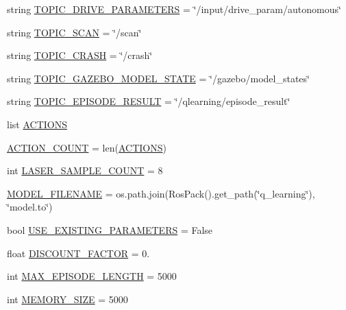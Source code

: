 \begin{DoxyCompactItemize}
\item 
string \hyperlink{namespaceparameters_a855cb11de60782b8e9997af80bdab518}{T\+O\+P\+I\+C\+\_\+\+D\+R\+I\+V\+E\+\_\+\+P\+A\+R\+A\+M\+E\+T\+E\+RS} = \char`\"{}/input/drive\+\_\+param/autonomous\char`\"{}
\item 
string \hyperlink{namespaceparameters_a28de242cdbba10666eb0c95aaef6812b}{T\+O\+P\+I\+C\+\_\+\+S\+C\+AN} = \char`\"{}/scan\char`\"{}
\item 
string \hyperlink{namespaceparameters_a5e392ed4d998f10824bfd96a0eae2988}{T\+O\+P\+I\+C\+\_\+\+C\+R\+A\+SH} = \char`\"{}/crash\char`\"{}
\item 
string \hyperlink{namespaceparameters_a9d4157266ec0afde91ab7d58be4f688d}{T\+O\+P\+I\+C\+\_\+\+G\+A\+Z\+E\+B\+O\+\_\+\+M\+O\+D\+E\+L\+\_\+\+S\+T\+A\+TE} = \char`\"{}/gazebo/model\+\_\+states\char`\"{}
\item 
string \hyperlink{namespaceparameters_aa69db8cd2d598f0d10212ea8df6a2139}{T\+O\+P\+I\+C\+\_\+\+E\+P\+I\+S\+O\+D\+E\+\_\+\+R\+E\+S\+U\+LT} = \char`\"{}/qlearning/episode\+\_\+result\char`\"{}
\item 
list \hyperlink{namespaceparameters_a585a25d0a26bcab4242d2e3fb1c1f93e}{A\+C\+T\+I\+O\+NS}
\item 
\hyperlink{namespaceparameters_ae4be13f6dac91f471da3efb4618a54c1}{A\+C\+T\+I\+O\+N\+\_\+\+C\+O\+U\+NT} = len(\hyperlink{namespaceparameters_a585a25d0a26bcab4242d2e3fb1c1f93e}{A\+C\+T\+I\+O\+NS})
\item 
int \hyperlink{namespaceparameters_a24735dce78cf9899cf1ec4bda2ea4eac}{L\+A\+S\+E\+R\+\_\+\+S\+A\+M\+P\+L\+E\+\_\+\+C\+O\+U\+NT} = 8
\item 
\hyperlink{namespaceparameters_aff8b0668384f3fa2d1212d3bd0ff42fa}{M\+O\+D\+E\+L\+\_\+\+F\+I\+L\+E\+N\+A\+ME} = os.\+path.\+join(Ros\+Pack().get\+\_\+path(\char`\"{}q\+\_\+learning\char`\"{}), \char`\"{}model.\+to\char`\"{})
\item 
bool \hyperlink{namespaceparameters_a0cffcb215ac12a1700baedb1a13ec8d5}{U\+S\+E\+\_\+\+E\+X\+I\+S\+T\+I\+N\+G\+\_\+\+P\+A\+R\+A\+M\+E\+T\+E\+RS} = False
\item 
float \hyperlink{namespaceparameters_a70176024e0f585c846365800f1c7819c}{D\+I\+S\+C\+O\+U\+N\+T\+\_\+\+F\+A\+C\+T\+OR} = 0.
\item 
int \hyperlink{namespaceparameters_aa473cc3b100416af3310c6c5a6d19570}{M\+A\+X\+\_\+\+E\+P\+I\+S\+O\+D\+E\+\_\+\+L\+E\+N\+G\+TH} = 5000
\item 
int \hyperlink{namespaceparameters_a49f1ad074b5710a98fc783c5627ddade}{M\+E\+M\+O\+R\+Y\+\_\+\+S\+I\+ZE} = 5000

\end{DoxyCompactItemize}
